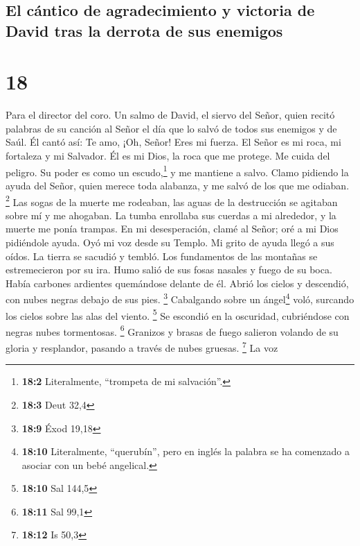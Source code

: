 \hypertarget{el-cuxe1ntico-de-agradecimiento-y-victoria-de-david-tras-la-derrota-de-sus-enemigos}{%
\subsection{El cántico de agradecimiento y victoria de David tras la
derrota de sus
enemigos}\label{el-cuxe1ntico-de-agradecimiento-y-victoria-de-david-tras-la-derrota-de-sus-enemigos}}

\hypertarget{section-17}{%
\section{18}\label{section-17}}

Para el director del coro. Un salmo de David, el siervo del Señor, quien
recitó palabras de su canción al Señor el día que lo salvó de todos sus
enemigos y de Saúl. Él cantó así:  Te amo, ¡Oh, Señor!
Eres mi fuerza.  El Señor es mi roca, mi fortaleza y mi
Salvador. Él es mi Dios, la roca que me protege. Me cuida del peligro.
Su poder es como un escudo,\footnote{\textbf{18:2} Literalmente,
  ``trompeta de mi salvación''.} y me mantiene a salvo. 
Clamo pidiendo la ayuda del Señor, quien merece toda alabanza, y me
salvó de los que me odiaban. \footnote{\textbf{18:3} Deut 32,4}
 Las sogas de la muerte me rodeaban, las aguas de la
destrucción se agitaban sobre mí y me ahogaban.  La tumba
enrollaba sus cuerdas a mi alrededor, y la muerte me ponía trampas.
 En mi desesperación, clamé al Señor; oré a mi Dios
pidiéndole ayuda. Oyó mi voz desde su Templo. Mi grito de ayuda llegó a
sus oídos.  La tierra se sacudió y tembló. Los fundamentos
de las montañas se estremecieron por su ira.  Humo salió
de sus fosas nasales y fuego de su boca. Había carbones ardientes
quemándose delante de él.  Abrió los cielos y descendió,
con nubes negras debajo de sus pies. \footnote{\textbf{18:9} Éxod 19,18}
 Cabalgando sobre un ángel\footnote{\textbf{18:10}
  Literalmente, ``querubín'', pero en inglés la palabra se ha comenzado
  a asociar con un bebé angelical.} voló, surcando los cielos sobre las
alas del viento. \footnote{\textbf{18:10} Sal 144,5}  Se
escondió en la oscuridad, cubriéndose con negras nubes tormentosas.
\footnote{\textbf{18:11} Sal 99,1}  Granizos y brasas de
fuego salieron volando de su gloria y resplandor, pasando a través de
nubes gruesas. \footnote{\textbf{18:12} Is 50,3}  La voz
